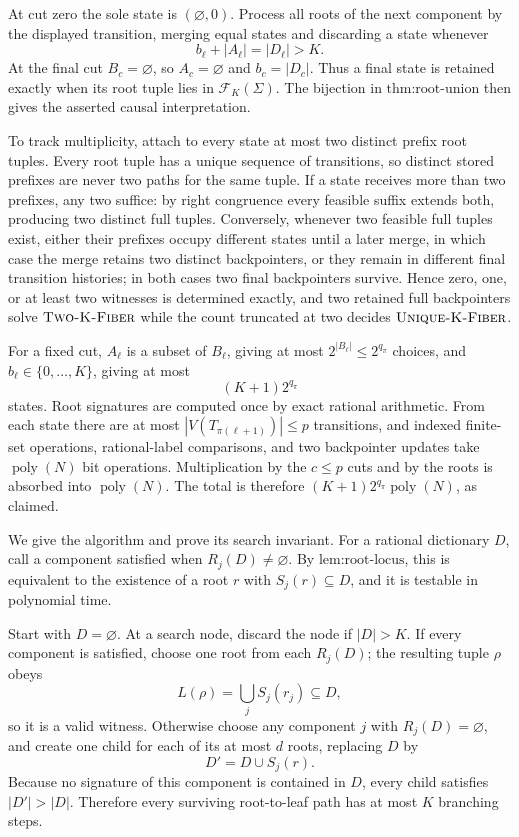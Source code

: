At cut zero the sole state is \((\varnothing,0)\).  Process all roots of the next component by the displayed transition, merging equal states and discarding a state whenever
\[
 b_\ell+|A_\ell|=|D_\ell|>K.
\]
At the final cut \(B_c=\varnothing\), so \(A_c=\varnothing\) and \(b_c=|D_c|\).  Thus a final state is retained exactly when its root tuple lies in \(\mathcal F_K(\Sigma)\).  The bijection in \(\text{thm:root-union}\) then gives the asserted causal interpretation.

To track multiplicity, attach to every state at most two distinct prefix root tuples.  Every root tuple has a unique sequence of transitions, so distinct stored prefixes are never two paths for the same tuple.  If a state receives more than two prefixes, any two suffice: by right congruence every feasible suffix extends both, producing two distinct full tuples.  Conversely, whenever two feasible full tuples exist, either their prefixes occupy different states until a later merge, in which case the merge retains two distinct backpointers, or they remain in different final transition histories; in both cases two final backpointers survive.  Hence zero, one, or at least two witnesses is determined exactly, and two retained full backpointers solve \(\textsc{Two-K-Fiber}\) while the count truncated at two decides \(\textsc{Unique-K-Fiber}\).

For a fixed cut, \(A_\ell\) is a subset of \(B_\ell\), giving at most \(2^{|B_\ell|}\le2^{q_\pi}\) choices, and \(b_\ell\in\{0,\ldots,K\}\), giving at most
\[
 (K+1)2^{q_\pi}
\]
states.  Root signatures are computed once by exact rational arithmetic.  From each state there are at most \(|V(T_{\pi(\ell+1)})|\le p\) transitions, and indexed finite-set operations, rational-label comparisons, and two backpointer updates take \(\operatorname{poly}(N)\) bit operations.  Multiplication by the \(c\le p\) cuts and by the roots is absorbed into \(\operatorname{poly}(N)\).  The total is therefore \((K+1)2^{q_\pi}\operatorname{poly}(N)\), as claimed.

We give the algorithm and prove its search invariant.  For a rational dictionary \(D\), call a component satisfied when \(R_j(D)\ne\varnothing\).  By \(\text{lem:root-locus}\), this is equivalent to the existence of a root \(r\) with \(S_j(r)\subseteq D\), and it is testable in polynomial time.

Start with \(D=\varnothing\).  At a search node, discard the node if \(|D|>K\).  If every component is satisfied, choose one root from each \(R_j(D)\); the resulting tuple \(\rho\) obeys
\[
 L(\rho)=\bigcup_jS_j(r_j)\subseteq D,
\]
so it is a valid witness.  Otherwise choose any component \(j\) with \(R_j(D)=\varnothing\), and create one child for each of its at most \(d\) roots, replacing \(D\) by
\[
 D'=D\cup S_j(r).
\]
Because no signature of this component is contained in \(D\), every child satisfies \(|D'|>|D|\).  Therefore every surviving root-to-leaf path has at most \(K\) branching steps.

